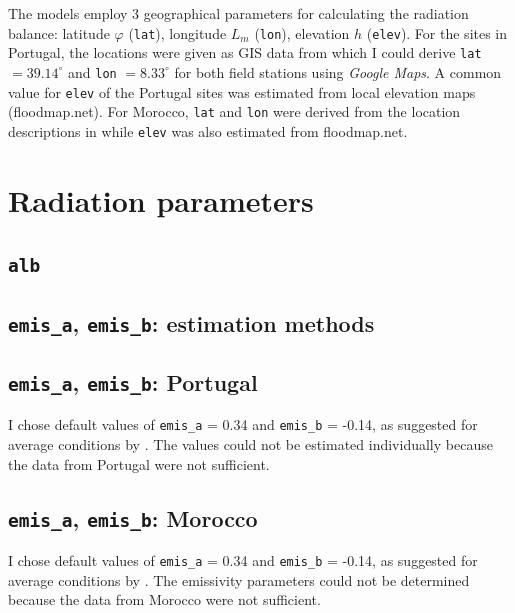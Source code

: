 \documentclass{scrreprt}
\begin{document}
The models employ 3 geographical parameters for calculating the radiation balance: latitude $\varphi$ (\verb!lat!), longitude $L_m$ (\verb!lon!), elevation $h$ (\verb!elev!). For the sites in Portugal, the locations were given as GIS data from which I could derive \verb!lat! $= 39.14^\circ$ and \verb!lon! $= 8.33^\circ$ for both field stations using \emph{Google Maps}. A common value for \verb!elev! of the Portugal sites was estimated from local elevation maps (floodmap.net). For Morocco, \verb!lat! and \verb!lon! were derived from the location descriptions in \citet{mroos14} while \verb!elev! was also estimated from floodmap.net.

\section{Radiation parameters} \label{sec:parest_rad}

\subsection{\texttt{alb}} \label{ssec:parest_rad_alb}

\subsection{\texttt{emis\_a}, \texttt{emis\_b}: estimation methods} \label{ssec:parest_rad_emismethods}

\subsection{\texttt{emis\_a}, \texttt{emis\_b}: Portugal} \label{ssec:parest_rad_emisportugal}

I chose default values of \verb!emis_a! = 0.34 and \verb!emis_b! = -0.14, as suggested for average conditions by \citet{maidment93}.
The values could not be estimated individually because the data from Portugal were not sufficient.

\subsection{\texttt{emis\_a}, \texttt{emis\_b}: Morocco} \label{ssec:parest_rad_emismorocco}

I chose default values of \verb!emis_a! = 0.34 and \verb!emis_b! = -0.14, as suggested for average conditions by \citet{maidment93}.
The emissivity parameters could not be determined because the data from Morocco were not sufficient.
\end{document}
